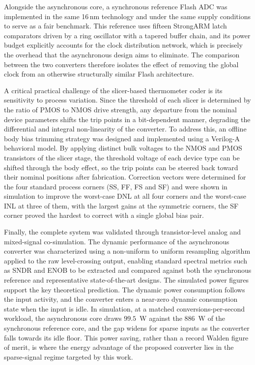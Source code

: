 Alongside the asynchronous core, a synchronous reference Flash ADC was implemented in the
same 16\,nm technology and under the same supply conditions to serve as a fair benchmark. This
reference uses fifteen StrongARM latch comparators driven by a ring oscillator with a tapered
buffer chain, and its power budget explicitly accounts for the clock distribution network, which is
precisely the overhead that the asynchronous design aims to eliminate. The comparison between the
two converters therefore isolates the effect of removing the global clock from an otherwise
structurally similar Flash architecture.

A critical practical challenge of the slicer-based thermometer coder is its sensitivity to process
variation. Since the threshold of each slicer is determined by the ratio of PMOS to NMOS drive
strength, any departure from the nominal device parameters shifts the trip points in a
bit-dependent manner, degrading the differential and integral non-linearity of the converter. To
address this, an offline body bias trimming strategy was designed and implemented using a
Verilog-A behavioral model. By applying distinct bulk voltages to the NMOS and PMOS
transistors of the slicer stage, the threshold voltage of each device type can be shifted through the
body effect, so the trip points can be steered back toward their nominal positions after
fabrication. Correction vectors were determined for the four standard process corners (SS, FF,
FS and SF) and were shown in simulation to improve the worst-case DNL at all four corners and
the worst-case INL at three of them, with the largest gains at the symmetric corners, the SF
corner proved the hardest to correct with a single global bias pair.

Finally, the complete system was validated through transistor-level analog and mixed-signal
co-simulation. The dynamic performance of the asynchronous converter was characterized using a
non-uniform to uniform resampling algorithm applied to the raw level-crossing output, enabling
standard spectral metrics such as SNDR and ENOB to be extracted and compared against both the
synchronous reference and representative state-of-the-art designs. The simulated power figures
support the key theoretical prediction. The dynamic power consumption follows the input activity,
and the converter enters a near-zero dynamic consumption state when the input
is idle. In simulation, at a matched conversions-per-second workload, the asynchronous core draws
$99.5$~\textmu W against the $886$~\textmu W of the synchronous reference core, and the gap
widens for sparse inputs as the converter falls towards its idle floor. This power saving, rather
than a record Walden figure of merit, is where the energy advantage of the proposed converter
lies in the sparse-signal regime targeted by this work.

